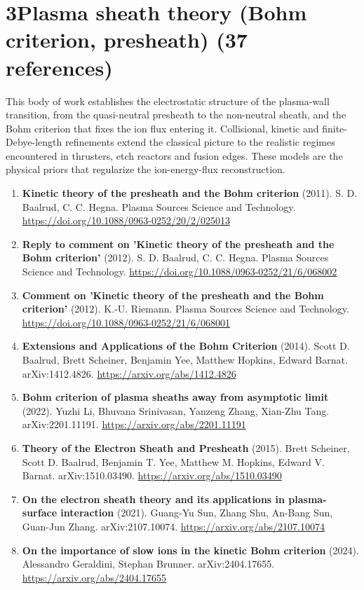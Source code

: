 \documentclass[11pt,a4paper]{article}
\begin{document}
\section*{3\quad Plasma sheath theory (Bohm criterion, presheath) \textnormal{(\normalsize 37 references)}}
This body of work establishes the electrostatic structure of the plasma-wall transition, from the quasi-neutral presheath to the non-neutral sheath, and the Bohm criterion that fixes the ion flux entering it. Collisional, kinetic and finite-Debye-length refinements extend the classical picture to the realistic regimes encountered in thrusters, etch reactors and fusion edges. These models are the physical priors that regularize the ion-energy-flux reconstruction.
\begin{enumerate}[leftmargin=1.4em]
\item \textbf{Kinetic theory of the presheath and the Bohm criterion} (2011). S. D. Baalrud, C. C. Hegna. Plasma Sources Science and Technology. \url{https://doi.org/10.1088/0963-0252/20/2/025013}
\item \textbf{Reply to comment on 'Kinetic theory of the presheath and the Bohm criterion'} (2012). S. D. Baalrud, C. C. Hegna. Plasma Sources Science and Technology. \url{https://doi.org/10.1088/0963-0252/21/6/068002}
\item \textbf{Comment on 'Kinetic theory of the presheath and the Bohm criterion'} (2012). K.-U. Riemann. Plasma Sources Science and Technology. \url{https://doi.org/10.1088/0963-0252/21/6/068001}
\item \textbf{Extensions and Applications of the Bohm Criterion} (2014). Scott D. Baalrud, Brett Scheiner, Benjamin Yee, Matthew Hopkins, Edward Barnat. arXiv:1412.4826. \url{https://arxiv.org/abs/1412.4826}
\item \textbf{Bohm criterion of plasma sheaths away from asymptotic limit} (2022). Yuzhi Li, Bhuvana Srinivasan, Yanzeng Zhang, Xian-Zhu Tang. arXiv:2201.11191. \url{https://arxiv.org/abs/2201.11191}
\item \textbf{Theory of the Electron Sheath and Presheath} (2015). Brett Scheiner, Scott D. Baalrud, Benjamin T. Yee, Matthew M. Hopkins, Edward V. Barnat. arXiv:1510.03490. \url{https://arxiv.org/abs/1510.03490}
\item \textbf{On the electron sheath theory and its applications in plasma-surface interaction} (2021). Guang-Yu Sun, Zhang Shu, An-Bang Sun, Guan-Jun Zhang. arXiv:2107.10074. \url{https://arxiv.org/abs/2107.10074}
\item \textbf{On the importance of slow ions in the kinetic Bohm criterion} (2024). Alessandro Geraldini, Stephan Brunner. arXiv:2404.17655. \url{https://arxiv.org/abs/2404.17655}

\end{enumerate}
\end{document}
